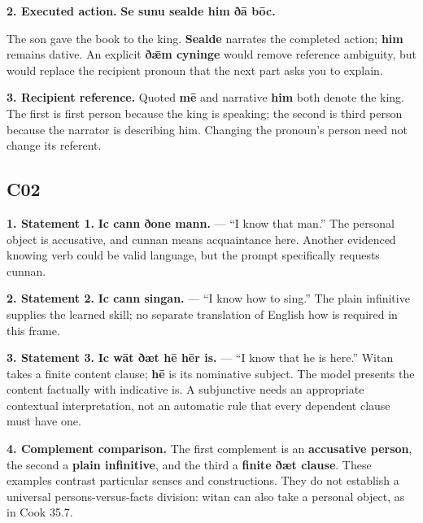 \textbf{2. Executed action.} \textbf{Se sunu sealde him ðā bōc.}

The son gave the book to the king. \textbf{Sealde} narrates the completed action; \textbf{him} remains dative. An explicit \textbf{ðǣm cyninge} would remove reference ambiguity, but would replace the recipient pronoun that the next part asks you to explain.

\textbf{3. Recipient reference.} Quoted \textbf{mē} and narrative \textbf{him} both denote the king. The first is first person because the king is speaking; the second is third person because the narrator is describing him. Changing the pronoun’s person need not change its referent.

\subsection*{C02}

\textbf{1. Statement 1.} \textbf{Ic cann ðone mann.} — “I know that man.” The personal object is accusative, and cunnan means acquaintance here. Another evidenced knowing verb could be valid language, but the prompt specifically requests cunnan.

\textbf{2. Statement 2.} \textbf{Ic cann singan.} — “I know how to sing.” The plain infinitive supplies the learned skill; no separate translation of English how is required in this frame.

\textbf{3. Statement 3.} \textbf{Ic wāt ðæt hē hēr is.} — “I know that he is here.” Witan takes a finite content clause; \textbf{hē} is its nominative subject. The model presents the content factually with indicative is. A subjunctive needs an appropriate contextual interpretation, not an automatic rule that every dependent clause must have one.

\textbf{4. Complement comparison.} The first complement is an \textbf{accusative person}, the second a \textbf{plain infinitive}, and the third a \textbf{finite ðæt clause}. These examples contrast particular senses and constructions. They do not establish a universal persons-versus-facts division: witan can also take a personal object, as in Cook 35.7.

